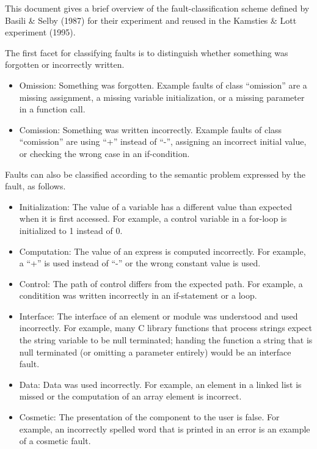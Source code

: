 This document gives a brief overview of the fault-classification
scheme defined by Basili \& Selby (1987) for their experiment and
reused in the Kamsties \& Lott experiment (1995).

The first facet for classifying faults is to distinguish whether
something was forgotten or incorrectly written.

\begin{itemize}

\item Omission: Something was forgotten.
Example faults of class ``omission'' are a missing assignment, a
missing variable initialization, or a missing parameter in a function
call. 

\item Comission: Something was written incorrectly.
Example faults of class ``comission'' are using ``+'' instead of
``-'', assigning an incorrect initial value, or checking the wrong
case in an if-condition.

\end{itemize}

Faults can also be classified according to the semantic problem
expressed by the fault, as follows.

\begin{itemize}

\item Initialization:  The value of a variable has a different value
than expected when it is first accessed.
For example, a control variable in a for-loop is initialized to 1
instead of 0.

\item Computation: The value of an express is computed incorrectly.
For example, a ``+'' is used instead of ``-'' or the wrong constant
value is used.

\item Control: The path of control differs from the expected path.
For example, a conditition was written incorrectly in an if-statement
or a loop.

\item Interface: The interface of an element or module was understood
and used incorrectly.
For example, many C library functions that process strings expect the
string variable to be null terminated; handing the function a string
that is null terminated (or omitting a parameter entirely) would be an
interface fault. 

\item Data: Data was used incorrectly.
For example, an element in a linked list is missed or the computation
of an array element is incorrect.

\item Cosmetic: The presentation of the component to the user is
false.
For example, an incorrectly spelled word that is printed in an error
is an example of a cosmetic fault.


\end{itemize}

